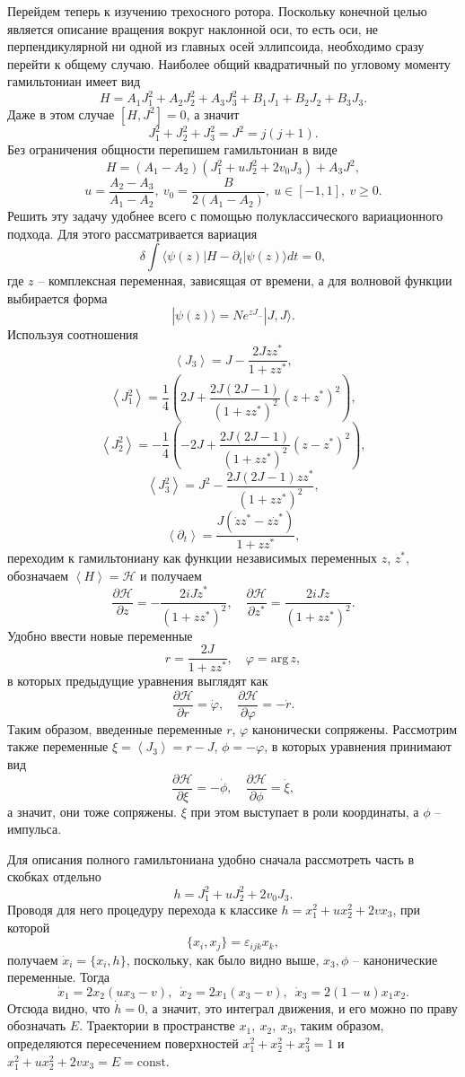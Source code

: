 \documentclass[a4paper, 10pt, twocolumn]{article}
\def\eps{\varepsilon}
\def\avg#1{\left\langle#1\right\rangle}
\def\H{\mathcal{H}}
\let\ophi\phi
\let\phi\varphi
\begin{document}
Перейдем теперь к изучению трехосного ротора. Поскольку конечной целью 
является описание вращения вокруг наклонной оси, то есть оси, не 
перпендикулярной ни одной из главных осей эллипсоида, необходимо сразу 
перейти к общему случаю. Наиболее общий квадратичный по угловому моменту 
гамильтониан имеет вид
$$ H = A_1 J_1^2 + A_2 J_2^2 + A_3 J_3^2 + B_1 J_1 + B_2 J_2 + B_3 J_3. $$
Даже в этом случае $[H, J^2] = 0$, а значит
$$ J_1^2 + J_2^2 + J_3^2 = J^2 = j(j+1). $$
Без ограничения общности перепишем гамильтониан в виде
$$ H = (A_1 - A_2) (J_1^2 + u J_2^2 + 2 v_0 J_3) + A_3 J^2, $$
$$ u = \frac{A_2 - A_3}{A_1 - A_2}, \ 
	 v_0 = \frac{B}{2(A_1 - A_2)}, \ 
	 u \in [-1, 1],\ v \geq 0. $$
Решить эту задачу удобнее всего с помощью полуклассического 
вариационного подхода. Для этого рассматривается вариация
$$ \delta \int \langle \psi(z) | H - \partial_t | \psi(z) \rangle d t = 0, $$
где $z$ -- комплексная переменная, зависящая от времени, а для волновой 
функции выбирается форма
$$|\psi(z)\rangle = N e^{z J_-} |J, J\rangle. $$
Используя соотношения
$$ \avg{J_3} = J - \frac{2Jzz^*}{1 + zz^*},$$
$$ \avg{J_1^2} = \frac{1}{4}\left(2J + \frac{2J (2J - 1)}{(1 + zz^*)^2}
   (z + z^*)^2\right), $$
$$ \avg{J_2^2} = -\frac{1}{4}\left(-2J + \frac{2J (2J - 1)}{(1 + zz^*)^2}
   (z - z^*)^2\right), $$
$$ \avg{J_3^2} = J^2 - \frac{2J (2J - 1)zz^*}{(1 + zz^*)^2}, $$
$$ \avg{\partial_t} = \frac{J (\dot zz^* - z\dot z^*)}{1 + zz^*}, $$
переходим к гамильтониану как функции независимых переменных $z$, $z^*$, 
обозначаем $\avg{H} = \H$ и получаем
$$ \frac{\partial \H}{\partial z} = - \frac{2iJ\dot z^*}{(1 + zz^*)^2},\quad
   \frac{\partial \H}{\partial z^*} =  \frac{2iJ\dot z}{(1 + zz^*)^2}. $$
Удобно ввести новые переменные
$$ r = \frac{2J}{1 + zz^*}, \quad \phi = \mathrm{arg}\,z, $$
в которых предыдущие уравнения выглядят как
$$ \frac{\partial \H}{\partial r} = \dot \phi,\quad
   \frac{\partial \H}{\partial \phi} =  - \dot r. $$
Таким образом, введенные переменные $r$, $\phi$ канонически сопряжены. 
Рассмотрим также переменные $\xi = \avg{J_3} = r - J$, $\ophi = - \phi$, 
в которых уравнения принимают вид
$$ \frac{\partial \H}{\partial \xi} = - \dot \ophi,\quad
   \frac{\partial \H}{\partial \ophi} =  \dot \xi, $$
а значит, они тоже сопряжены. $\xi$ при этом выступает в роли 
координаты, а $\ophi$ -- импульса.

Для описания полного гамильтониана удобно сначала рассмотреть часть 
в скобках отдельно
$$ h = J_1^2 + u J_2^2 + 2 v_0 J_3. $$
Проводя для него процедуру перехода к классике $ h = x_1^2 + u x_2^2 
+ 2 v x_3$,  при которой
$$ \{x_i, x_j\} = \eps_{ijk} x_k, $$
получаем $\dot x_i = \{x_i, h\}$, поскольку, как было видно выше, $x_3, 
\ophi$ -- канонические переменные. Тогда
$$ \dot x_1 = 2 x_2 (u x_3 - v),\;\:
   \dot x_2 = 2 x_1 (x_3 - v), \;\:
	 \dot x_3 = 2(1 - u) x_1 x_2. $$
Отсюда видно, что $\dot h = 0$, а значит, это интеграл движения, и его 
можно по праву обозначать $E$. Траектории в пространстве $x_1,\ x_2,\ 
x_3$, таким образом, определяются пересечением поверхностей $x_1^2 
+ x_2^2 + x_3^2 = 1$ и $x_1^2 + u x_2^2 + 2v x_3 = E = \mathrm{const}.$
\end{document}
